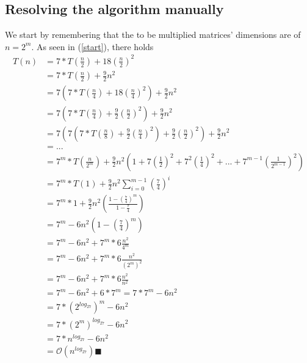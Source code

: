 \documentclass[11pt,a4paper]{article}
\begin{document}
\subsection{Resolving the algorithm manually}
We start by remembering that the to be multiplied matrices' dimensions are of $n=2^m$. As seen in (\ref{start}), there holds
\newline
\begin{equation}
    \begin{split}
        T(n) & = 7*T\left(\frac{n}{2}\right) + 18\left(\frac{n}{2}\right)^2 \\
        & = 7*T\left(\frac{n}{2}\right) + \frac{9}{2}n^2 \\
        & = 7\left(7*T\left(\frac{n}{4}\right)+18\left(\frac{n}{4}\right)^2\right)+\frac{9}{2}n^2 \\
        & = 7\left(7*T\left(\frac{n}{4}\right)+\frac{9}{2}\left(\frac{n}{2}\right)^2\right)+\frac{9}{2}n^2 \\
        & = 7 \left( 7 \left( 7*T\left(\frac{n}{8}\right) + \frac{9}{2}\left(\frac{n}{4}\right)^2 \right) + \frac{9}{2}\left(\frac{n}{2}\right)^2 \right)+ \frac{9}{2}n^2\\
        & = ...\\
        & = 7^m*T\left(\frac{n}{2^m}\right) + 
        \frac{9}{2}n^2 
        \left( 1 + 7\left(\frac{1}{2}\right)^2 +
        7^2\left(\frac{1}{4}\right)^2 + ... + 
        7^{m-1}\left(\frac{1}{2^{m-1}}\right)^2
        \right) \\
        & = 7^m*T(1) + \frac{9}{2}n^2
        \sum_{i=0}^{m-1} \left(\frac{7}{4}\right)^i\\
        & = 7^m*1 + \frac{9}{2}n^2 
        \left(\frac{1-\left(\frac{7}{4}\right)^m}{1-\frac{7}{4}}\right)\\
        & = 7^m - 6n^2 \left(1-\left(\frac{7}{4}\right)^m\right)\\
        & = 7^m - 6n^2 + 7^m*6\frac{n^2}{4^m} \\
        & = 7^m - 6n^2 + 7^m*6\frac{n^2}{\left(2^m\right)^2} \\
        & = 7^m - 6n^2 + 7^m*6\frac{n^2}{n^2} \\
        & = 7^m - 6n^2 + 6*7^m = 7*7^m-6n^2 \\
        & = 7*\left(2^{log_27}\right)^m - 6n^2 \\
        & = 7*\left(2^{m}\right)^{log_27}- 6n^2\\
        & = 7*n^{log_27} - 6n^2 \\
        & = \mathcal{O} \left(n^{log_27}\right) \blacksquare
    \end{split} 
\end{equation}
\end{document}
